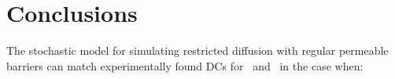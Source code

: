 %
%

\section{Conclusions}
The stochastic model for simulating restricted diffusion with regular permeable
barriers can match  experimentally found \acp{DC} for
\ATP\ and \DEX\ in the case when: 

